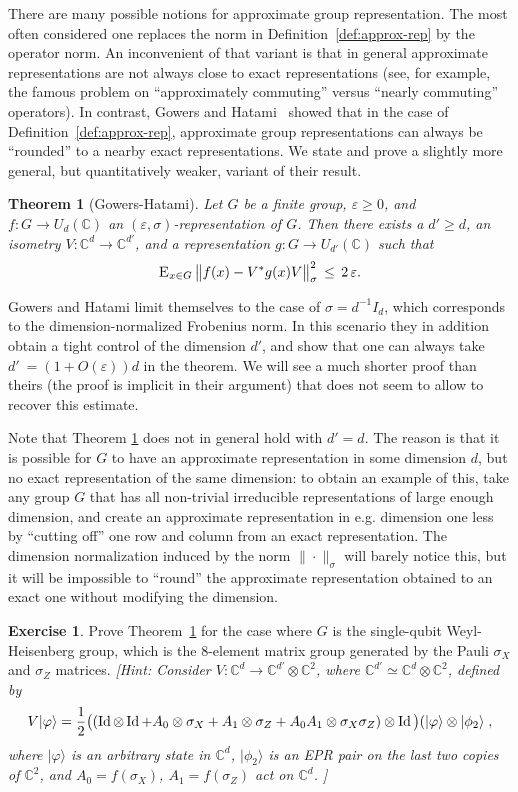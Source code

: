 \documentclass{report}
\theoremstyle{plain}
\newtheorem{theorem}[subsection]{Theorem}
\theoremstyle{definition}
\newtheorem{exercise}[subsection]{Exercise}
\theoremstyle{remark}
\newcommand{\ket}[1]{|#1\rangle}
\newcommand{\Id}{\ensuremath{\mathop{\rm Id}\nolimits}}
\newcommand{\Es}[1]{\textsc{E}_{#1}}
\newcommand{\C}{\ensuremath{\mathbb{C}}}
\newcommand{\eps}{\varepsilon}
\numberwithin{equation}{subsection}
\begin{document}
There are many possible notions for approximate group representation. The most often considered one replaces the norm in Definition~\ref{def:approx-rep} by the operator norm. An inconvenient of that variant is that in general approximate representations are not always close to exact representations (see, for example, the famous problem on ``approximately commuting'' versus ``nearly commuting'' operators). In contrast, 
Gowers and Hatami~\cite{gowers2015inverse} showed that in the case of Definition~\ref{def:approx-rep}, approximate group representations can always be ``rounded'' to a nearby exact representations. We state and prove a slightly more general, but quantitatively weaker, variant of their result.

\begin{theorem}[Gowers-Hatami]\label{thm:gh}
Let $G$ be a finite group, $\eps\geq 0$, and $f:G\to U_d(\C)$ an $(\eps,\sigma)$-representation of $G$. Then there exists a $d'\geq d$, an isometry $V:\C^d\to \C^{d'}$, and a representation $g:G\to U_{d'}(\C)$ such that 
$$\Es{x\in G}\, \big\| f(x) - V^*g(x)V \big\|_\sigma^2\, \leq\, 2\,\eps.$$ 
\end{theorem}

Gowers and Hatami limit themselves to the case of $\sigma = d^{-1}I_d$, which corresponds to the dimension-normalized Frobenius norm. In this scenario they in addition obtain a tight control of the dimension $d'$, and show that one can always take $d'\ = (1+O(\eps))d$ in the theorem. We will see a much shorter proof than theirs (the proof is implicit in their argument) that does not seem to allow to recover this estimate. 

Note that  Theorem \ref{thm:gh} does not in general hold  with $d'=d$. The reason is that it is possible for $G$ to have an approximate representation in some dimension $d$, but no exact representation of the same dimension: to obtain an example of this, take any group $G$ that has all non-trivial irreducible representations of large enough dimension, and create an approximate representation in e.g. dimension one less by ``cutting off'' one row and column from an exact representation. The dimension normalization induced by the norm $\|\cdot\|_\sigma$ will barely notice this, but it will be impossible to ``round'' the approximate representation obtained to an exact one without modifying the dimension. 

\begin{exercise}
Prove Theorem~\ref{thm:gh} for the case where $G$ is the single-qubit Weyl-Heisenberg group, which is the $8$-element matrix group generated by the Pauli $\sigma_X$ and $\sigma_Z$ matrices. \emph{[Hint: Consider $V:\C^d \to \C^{d'} \otimes \C^2$, where $\C^{d'} \simeq \C^d \otimes \C^2 $, defined by 
$$V\ket{\varphi} = \frac{1}{2}\big((\Id\otimes \Id + A_0 \otimes \sigma_X + A_1 \otimes \sigma_Z + A_0A_1 \otimes \sigma_X\sigma_Z)\otimes \Id \big)(\ket{\varphi} \otimes \ket{\phi_2}\;,$$
where $\ket{\varphi}$ is an arbitrary state in $\C^d$, $\ket{\phi_2}$ is an EPR pair on the last two copies of $\C^2$, and $A_0=f(\sigma_X)$, $A_1=f(\sigma_Z)$ act on $\C^d$. 
 ]}
\end{exercise}
\end{document}

